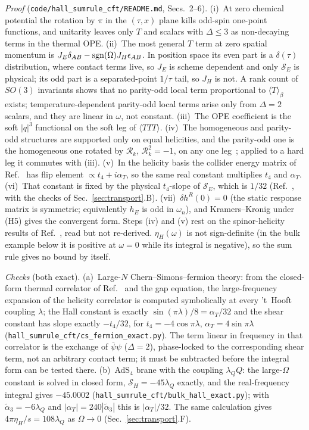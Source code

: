 \emph{Proof} (\texttt{code/hall\_sumrule\_cft/README.md}, Secs.~2--6). (i)~At zero chemical potential the rotation by $\pi$ in the
$(\tau,x)$ plane kills odd-spin one-point functions, and unitarity leaves only $T$ and scalars with $\Delta\le3$ as non-decaying terms
in the thermal OPE. (ii)~The most general $T$ term at zero spatial momentum is $J_E\delta_{AB}-{\rm sgn}(\Omega)J_H\epsilon_{AB}$. In
position space its even part is a $\delta(\tau)$ distribution, where contact terms live, so $J_E$ is scheme dependent and only
$\mathcal S_E$ is physical; its odd part is a separated-point $1/\tau$ tail, so $J_H$ is not. A rank count of $SO(3)$ invariants shows
that no parity-odd local term proportional to $\langle T\rangle_\beta$ exists; temperature-dependent parity-odd local terms arise only
from $\Delta=2$ scalars, and they are linear in $\omega$, not constant. (iii)~The OPE coefficient is the soft $|q|^3$ functional on the
soft leg of $\langle TTT\rangle$. (iv)~The homogeneous and parity-odd structures are supported only on equal helicities, and the
parity-odd one is the homogeneous one rotated by $\mathcal R_k$, $\mathcal R_k^2=-1$, on any one leg~\cite{Jain:2021gwa}; applied to a
hard leg it commutes with (iii). (v)~In the helicity basis the collider energy matrix of Ref.~\cite{CDPrakash} has flip element
$\propto t_4+i\alpha_T$, so the same real constant multiplies $t_4$ and $\alpha_T$. (vi)~That constant is fixed by the physical
$t_4$-slope of $\mathcal S_E$, which is $1/32$ (Ref.~\cite{Chowdhury:2016hjy}, with the checks of Sec.~\ref{sec:transport}.B).
(vii)~$\delta h^R(0)=0$ (the static response matrix is symmetric; equivalently $h_E$ is odd in $\omega_n$), and Kramers--Kronig under
(H5) gives the convergent form. Steps (iv) and (v) rest on the spinor-helicity results of Ref.~\cite{Jain:2021gwa}, read but not
re-derived. $\eta_H(\omega)$ is not sign-definite (in the bulk example below it is positive at $\omega=0$ while its integral is negative),
so the sum rule gives no bound by itself.

\emph{Checks} (both exact). (a)~Large-$N$ Chern--Simons--fermion theory: from the closed-form thermal correlator of
Ref.~\cite{Ghosh:2019sqf} and the gap equation, the large-frequency expansion of the helicity correlator is computed symbolically at
every 't~Hooft coupling $\lambda$; the Hall constant is exactly $\sin(\pi\lambda)/8=\alpha_T/32$ and the shear constant has slope
exactly $-t_4/32$, for $t_4=-4\cos\pi\lambda$, $\alpha_T=4\sin\pi\lambda$ (\texttt{hall\_sumrule\_cft/cs\_fermion\_exact.py}). The term
linear in frequency in that correlator is the exchange of $\bar\psi\psi$ ($\Delta=2$), phase-locked to the corresponding shear term,
not an arbitrary contact term; it must be subtracted before the integral form can be tested there. (b)~AdS$_4$ brane with the coupling
$\lambda_QQ$: the large-$\Omega$ constant is solved in closed form, $\mathcal S_H=-45\lambda_Q$ exactly, and the real-frequency integral
gives $-45.0002$ (\texttt{hall\_sumrule\_cft/bulk\_hall\_exact.py}); with $\tilde\alpha_3=-6\lambda_Q$ and $|\alpha_T|=240|\tilde\alpha_3|$
this is $|\alpha_T|/32$. The same calculation gives $4\pi\eta_H/s=108\lambda_Q$ as $\Omega\to0$ (Sec.~\ref{sec:transport}.F).

